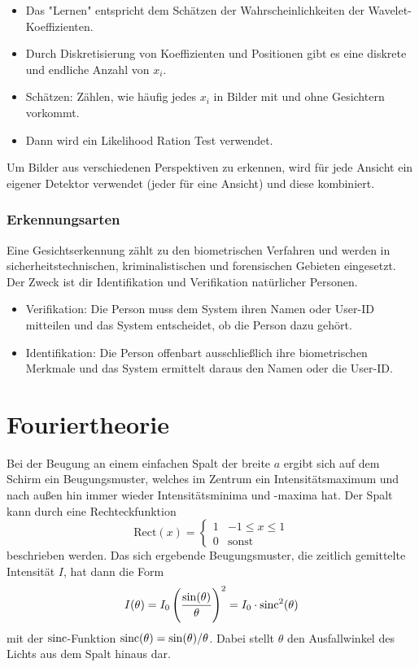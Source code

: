 \begin{enumerate}
\begin{itemize}
\begin{itemize}
							\end{itemize}
						\item Das "Lernen" entspricht dem Schätzen der Wahrscheinlichkeiten der Wavelet-Koeffizienten.
						\item Durch Diskretisierung von Koeffizienten und Positionen gibt es eine diskrete und endliche Anzahl von \(x_i\).
						\item Schätzen: Zählen, wie häufig jedes \(x_i\) in Bilder mit und ohne Gesichtern vorkommt.
						\item Dann wird ein Likelihood Ration Test verwendet.
					\end{itemize}
			\end{enumerate}
		
			Um Bilder aus verschiedenen Perspektiven zu erkennen, wird für jede Ansicht ein eigener Detektor verwendet (jeder für eine Ansicht) und diese kombiniert.

		\subsection{Erkennungsarten}
			Eine Gesichtserkennung zählt zu den biometrischen Verfahren und werden \bspw in sicherheitstechnischen, kriminalistischen und forensischen Gebieten eingesetzt. Der Zweck ist dir Identifikation und Verifikation natürlicher Personen.
			\begin{itemize}
				\item Verifikation: Die Person muss dem System ihren Namen oder User-ID mitteilen und das System entscheidet, ob die Person dazu gehört.
				\item Identifikation: Die Person offenbart ausschließlich ihre biometrischen Merkmale und das System ermittelt daraus den Namen oder die User-ID.
			\end{itemize}

\chapter{Fouriertheorie}
	Bei der Beugung an einem einfachen Spalt der breite \(a\) ergibt sich auf dem Schirm ein Beugungsmuster, welches im Zentrum ein Intensitätsmaximum und nach außen hin immer wieder Intensitätsminima und -maxima hat. Der Spalt kann durch eine Rechteckfunktion
	\begin{equation*}
		\text{Rect}(x) =
			\begin{cases}
				1 & -1 \leq x \leq 1 \\
				0 & \text{sonst}
			\end{cases}
	\end{equation*}
	beschrieben werden. Das sich ergebende Beugungsmuster, \bzw die zeitlich gemittelte Intensität \(I\), hat dann die Form
	\begin{equation*}
		I(\theta) = I_0 \, \Bigg( \frac{\sin(\theta)}{\theta} \Bigg)^2 = I_0 \cdot \operatorname{sinc}^2(\theta)
	\end{equation*}
	mit der \(\operatorname{sinc}\)-Funktion \( \operatorname{sinc}(\theta) = \sin(\theta) / \theta \). Dabei stellt \(\theta\) den Ausfallwinkel des Lichts aus dem Spalt hinaus dar.
	
